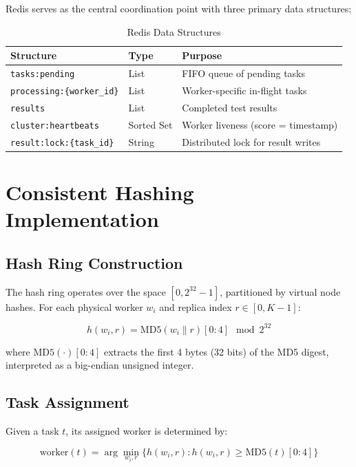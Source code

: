 \documentclass[11pt,a4paper]{article}
\begin{document}
Redis serves as the central coordination point with three primary data structures:

\begin{table}[h]
\centering
\begin{tabular}{@{}lll@{}}
\toprule
\textbf{Structure} & \textbf{Type} & \textbf{Purpose} \\ \midrule
\texttt{tasks:pending} & List & FIFO queue of pending tasks \\
\texttt{processing:\{worker\_id\}} & List & Worker-specific in-flight tasks \\
\texttt{results} & List & Completed test results \\
\texttt{cluster:heartbeats} & Sorted Set & Worker liveness (score = timestamp) \\
\texttt{result:lock:\{task\_id\}} & String & Distributed lock for result writes \\ \bottomrule
\end{tabular}
\caption{Redis Data Structures}
\label{tab:redis_structures}
\end{table}

\section{Consistent Hashing Implementation}

\subsection{Hash Ring Construction}

The hash ring operates over the space $[0, 2^{32} - 1]$, partitioned by virtual node hashes. For each physical worker $w_i$ and replica index $r \in [0, K-1]$:

\begin{equation}
h(w_i, r) = \text{MD5}(w_i \| r)[0:4] \mod 2^{32}
\end{equation}

where $\text{MD5}(\cdot)[0:4]$ extracts the first 4 bytes (32 bits) of the MD5 digest, interpreted as a big-endian unsigned integer.

\subsection{Task Assignment}

Given a task $t$, its assigned worker is determined by:

\begin{equation}
\text{worker}(t) = \arg\min_{w_i, r} \{ h(w_i, r) : h(w_i, r) \geq \text{MD5}(t)[0:4] \}
\end{equation}
\end{document}
